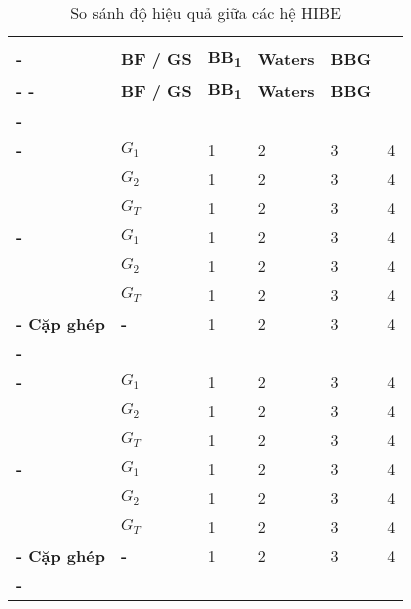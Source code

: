 \baselineskip
\begin{longtabu}{| >{\bfseries\centering}p{2cm} | >{\bfseries\centering}p{0.5cm} | X[c] X[c] X[c] X[c] |}
	\captionsetup{font=normalsize}
	\caption{So sánh độ hiệu quả giữa các hệ HIBE} \\
	\tabucline[4pt]-
	 		&
	\bfseries BF / GS		 		&
	\bfseries BB\textsubscript{1} 	&
	\bfseries Waters 				&
	\bfseries BBG 					\\
	\tabucline[2pt]-
	\endfirsthead
	\tabucline[4pt]-
	 		&
	\bfseries BF / GS		 		&
	\bfseries BB\textsubscript{1} 	&
	\bfseries Waters 				&
	\bfseries BBG 					\\
	\tabucline[2pt]-
	\endhead
	 \\
	\tabucline[1pt]-
	& $G_1$ 			& 	1 	& 	2 	& 	3 	& 	4 	\\
	& $G_2$ 			& 	1 	& 	2 	& 	3 	& 	4 	\\
	& $G_T$ 			& 	1 	& 	2 	& 	3 	& 	4 	\\
	\tabucline[1pt]-
	& $G_1$ 			& 	1 	& 	2 	& 	3 	& 	4 	\\
	& $G_2$ 			& 	1 	& 	2 	& 	3 	& 	4 	\\
	& $G_T$ 			& 	1 	& 	2 	& 	3 	& 	4 	\\
	\tabucline[1pt]-
	Cặp ghép & - 		& 	1 	& 	2 	& 	3 	& 	4 	\\
	\tabucline[2pt]-
	 \\
	\tabucline[1pt]-
	& $G_1$ 			& 	1 	& 	2 	& 	3 	& 	4 	\\
	& $G_2$ 			& 	1 	& 	2 	& 	3 	& 	4 	\\
	& $G_T$ 			& 	1 	& 	2 	& 	3 	& 	4 	\\
	\tabucline[1pt]-
	& $G_1$ 			& 	1 	& 	2 	& 	3 	& 	4 	\\
	& $G_2$ 			& 	1 	& 	2 	& 	3 	& 	4 	\\
	& $G_T$ 			& 	1 	& 	2 	& 	3 	& 	4 	\\
	\tabucline[1pt]-
	Cặp ghép & - 		& 	1 	& 	2 	& 	3 	& 	4 	\\
	\tabucline[2pt]-
	 \\

\end{longtabu}
